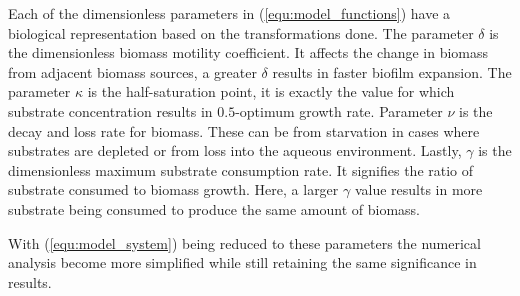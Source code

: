 Each of the dimensionless parameters in (\ref{equ:model_functions}) have a biological representation based on the transformations done.
The parameter $\delta$ is the dimensionless biomass motility coefficient.
It affects the change in biomass from adjacent biomass sources, a greater $\delta$ results in faster biofilm expansion.
The parameter $\kappa$ is the half-saturation point, it is exactly the value for which substrate concentration results in $0.5$-optimum growth rate.
Parameter $\nu$ is the decay and loss rate for biomass.
These can be from starvation in cases where substrates are depleted or from loss into the aqueous environment.
Lastly, $\gamma$ is the dimensionless maximum substrate consumption rate.
It signifies the ratio of substrate consumed to biomass growth.
Here, a larger $\gamma$ value results in more substrate being consumed to  produce the same amount of biomass. 

With (\ref{equ:model_system}) being reduced to these parameters the numerical analysis become more simplified while still retaining the same significance in results.
